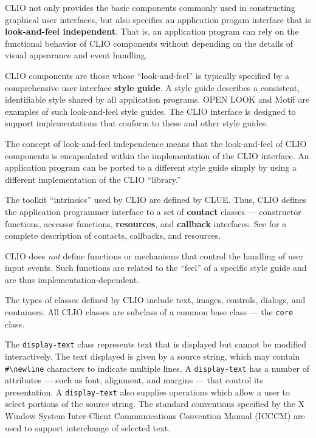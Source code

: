 CLIO  not only provides the basic components commonly used in
constructing graphical user interfaces, but also  specifies an application
progam interface that is {\bf look-and-feel independent}.   That is, an application program can rely on the functional
behavior of CLIO components without depending on the details of visual
appearance and event handling.  

CLIO components are those whose ``look-and-feel'' is typically specified by a
comprehensive user interface {\bf style guide}.
A style guide describes a consistent, identifiable style shared by all application
programs.  OPEN LOOK\footnotemark{}
and Motif\footnotemark{} are examples of such look-and-feel style guides.  The CLIO interface
is designed to support implementations that conform to these and other style
guides.

The concept of look-and-feel independence means that the look-and-feel of CLIO
components is encapsulated within the implementation of the CLIO interface. An
application program can be ported to a different style guide simply by using
a different implementation of the CLIO ``library.''


The toolkit ``intrinsics'' used by CLIO are defined by CLUE. Thus,
CLIO defines the application programmer interface to a set of {\bf contact}
 classes --- constructor functions, accessor functions, {\bf
resources}, and {\bf callback} interfaces.  See
\cite{clue} for a complete description of contacts, callbacks, and resources.

CLIO does {\em not} define functions or mechanisms that control the handling of
user input events.  Such functions are related to the ``feel'' of a specific style
guide and are thus implementation-dependent.

The types of classes defined by CLIO include text, images, controls, dialogs,
and containers.  All CLIO classes are subclass of a common base class --- the
{\tt core} class.


The {\tt display-text} class represents text that is
displayed but cannot be modified interactively.  The text displayed is given by
a source string, which may contain \verb+#\newline+ characters to indicate multiple
lines.
A {\tt display-text} has a number of attributes --- such as font, alignment, and
margins --- that control its presentation.  A {\tt display-text} also supplies
operations which allow a user to select portions of the source string.  The
standard conventions specified by the X Window System Inter-Client
Communications Convention Manual (ICCCM)\cite{icccm} are used to support
interchange of selected text.


